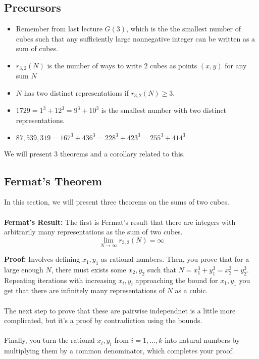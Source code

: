 \documentclass[8pt]{extarticle}
\begin{document}
\subsection{Precursors}
\begin{itemize}
    \item Remember from last lecture $G(3)$, which is the the smallest number of cubes such that any sufficiently large nonnegative integer can be written as a sum of cubes.
    \item $r_{3,2}(N)$ is the number of ways to write $2$ cubes as points $(x,y)$ for any sum $N$
    \item $N$ has two distinct representations if $r_{3,2}(N) \geq 3$.
    \item $1729 = 1^3 + 12^3 = 9^3 + 10^3$ is the smallest number with two distinct representations.
    \item $87,539,319 = 167^3 + 436^3 = 228^3 + 423^3 = 255^3 + 414^3$
\end{itemize}
We will present $3$ theorems and a corollary related to this.
\subsection{Fermat's Theorem}
In this section, we will present three theorems on the sums of two cubes. \\
\\
\textbf{Fermat's Result:} The first is Fermat's result that there are integers with arbitrarily many representations as the sum of two cubes.
$$
\lim_{N\rightarrow\infty} r_{3,2}(N) = \infty
$$
\begin{boxedsection}
\textbf{Proof:} Involves defining $x_1, y_1$ as rational numbers. Then, you prove that for a large enough $N$, there must exists some $x_2, y_2$ such that $N = x_1^3 + y_1^3 = x_2^3 + y_2^3$. Repeating iterations with increasing $x_i,y_i$ approaching the bound for $x_1,y_1$ you get that there are infinitely many representations of $N$ as a cubic. \\
\\
The next step to prove that these are pairwise independnet is a little more complicated, but it's a proof by contradiction using the bounds. \\
\\
Finally, you turn the rational $x_i, y_i$ from $i = 1, \dots, k$ into natural numbers by multiplying them by a common denominator, which completes your proof.
\end{boxedsection}
\end{document}
